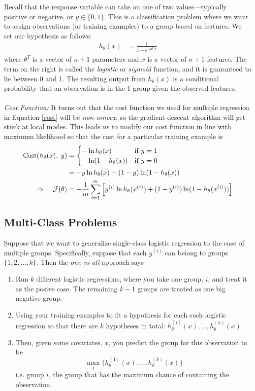 \documentclass[12pt]{article}
\begin{document}
Recall that the response variable can take on one of two
values---typically positive or negative, or $y \in \{0,1\}$.
This is a classification problem where we want to assign observations
(or training examples) to a group based on features. We set our
hypothesis as follows:
\begin{align*}
   h_\theta(x) &= \frac{1}{1+e^{-\theta^T \; x}}
\end{align*}
where $\theta^T$ is a vector of $n+1$ parameters and $x$ is a vector
of $n+1$ features.
The term on the right is called the \emph{logistic} or \emph{sigmoid}
function, and it is guaranteed to lie between 0 and 1.
The resulting output from $h_\theta(x)$ is a conditional probability
that an observation is in the 1 group given the observed features.
\\
\\
{\sl Cost Function:} It turns out that the cost function we used
for multiple regression in Equation \ref{cost} will be
\emph{non-convex}, so the gradient descent algorithm will get stuck
at local modes.  This leads us to modify our cost function in
line with maximum likelihood so that
the cost for a particular training example is
\begin{align}
    \text{Cost}(h_\theta(x),\;y) &= \begin{cases}
      -\ln h_\theta(x) & \text{if $y=1$} \\
      -\ln (1-h_\theta(x)) &\text{if $y=0$} \end{cases}\notag\\
    &=-y \ln h_\theta(x)- (1-y) \ln(1-h_\theta(x))\\
    \Rightarrow \quad
    \mathcal{J}(\theta) &= -\frac{1}{m}\sum^m_{i=1}\left[
    y^{(i)} \ln h_\theta(x^{(i)}) +(1-y^{(i)})\ln (1-h_\theta(x^{(i)})
    )\right]
\end{align}


\subsection{Multi-Class Problems}

Suppose that we want to generalize single-class logistic regression
to the case of multiple groups. Specifically, suppose that each
$y^{(i)}$ can belong to groups $\{1,2,\ldots,k\}$. Then the
\emph{one-vs-all} approach says
\begin{enumerate}
   \item Run $k$ different logistic regressions, where you take one
      group, $i$, and treat it as the posive case. The remaining
      $k-1$ groups are treated as one big negative group.
   \item Using your training examples
      to fit a hypothesis for each such logistic regression so that
      there are $k$ hypotheses in total: $h_\theta^{(i)}(x), \ldots,
      h_\theta^{(k)}(x)$.
   \item Then, given some covariates, $x$, you predict the group
      for this observation to be
      \[ \max_i \{ h_\theta^{(1)}(x), \ldots, h_\theta^{(k)}(x)\} \]
      i.e. group $i$, the group that has the maximum chance
      of containing the observation.
\end{enumerate}
\end{document}
